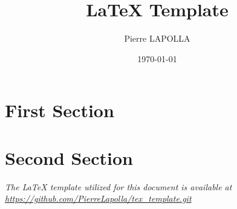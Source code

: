 \documentclass[10pt]{article}
\title{\LaTeX{} Template}
\author{Pierre LAPOLLA}
\date{\today}
\begin{document}
    \maketitle
    \tableofcontents


    \section{First Section}\label{sec:first-section}
    


    \section{Second Section}\label{sec:second-section}
    

    \vfill
    \begin{center}
        \textit{The \LaTeX{} template utilized for this document is available at \url{https://github.com/PierreLapolla/tex_template.git}}
    \end{center}
\end{document}
